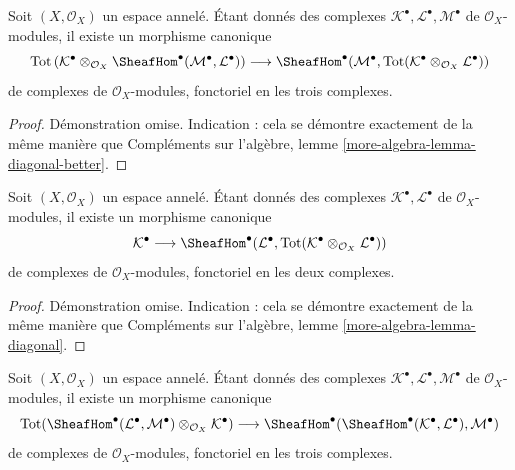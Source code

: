 {\begin{lemma}
Soit $(X, \mathcal{O}_X)$ un espace annelé. Étant donnés des complexes
$\mathcal{K}^\bullet, \mathcal{L}^\bullet, \mathcal{M}^\bullet$
de $\mathcal{O}_X$-modules, il existe un morphisme canonique
$$
\text{Tot}\left(
\mathcal{K}^\bullet \otimes_{\mathcal{O}_X}
\SheafHom^\bullet(\mathcal{M}^\bullet, \mathcal{L}^\bullet)
\right)
\longrightarrow
\SheafHom^\bullet(\mathcal{M}^\bullet,
\text{Tot}(\mathcal{K}^\bullet \otimes_{\mathcal{O}_X} \mathcal{L}^\bullet))
$$
de complexes de $\mathcal{O}_X$-modules, fonctoriel en les trois complexes.

\end{lemma}

\begin{proof}
Démonstration omise. Indication : cela se démontre exactement de la même manière que Compléments sur l'algèbre, lemme \ref{more-algebra-lemma-diagonal-better}.
\end{proof}

\begin{lemma}

\label{lemma-diagonal}

Soit $(X, \mathcal{O}_X)$ un espace annelé. Étant donnés des complexes
$\mathcal{K}^\bullet, \mathcal{L}^\bullet$
de $\mathcal{O}_X$-modules, il existe un morphisme canonique
$$
\mathcal{K}^\bullet
\longrightarrow
\SheafHom^\bullet(\mathcal{L}^\bullet,
\text{Tot}(\mathcal{K}^\bullet \otimes_{\mathcal{O}_X} \mathcal{L}^\bullet))
$$
de complexes de $\mathcal{O}_X$-modules, fonctoriel en les deux complexes.

\end{lemma}

\begin{proof}
Démonstration omise. Indication : cela se démontre exactement de la même manière que Compléments sur l'algèbre, lemme \ref{more-algebra-lemma-diagonal}.
\end{proof}

\begin{lemma}

\label{lemma-evaluate-and-more}

Soit $(X, \mathcal{O}_X)$ un espace annelé. Étant donnés des complexes
$\mathcal{K}^\bullet, \mathcal{L}^\bullet, \mathcal{M}^\bullet$
de $\mathcal{O}_X$-modules, il existe un morphisme canonique
$$
\text{Tot}(\SheafHom^\bullet(\mathcal{L}^\bullet,
\mathcal{M}^\bullet) \otimes_{\mathcal{O}_X} \mathcal{K}^\bullet)
\longrightarrow
\SheafHom^\bullet(\SheafHom^\bullet(\mathcal{K}^\bullet,
\mathcal{L}^\bullet), \mathcal{M}^\bullet)
$$
de complexes de $\mathcal{O}_X$-modules, fonctoriel en les trois complexes.


\end{lemma}}
